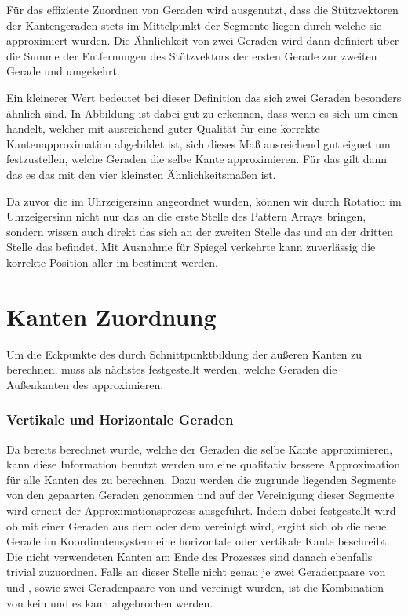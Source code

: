 Für das effiziente Zuordnen von Geraden wird ausgenutzt, dass die Stützvektoren der Kantengeraden stets im Mittelpunkt der Segmente liegen durch welche sie approximiert wurden. Die Ähnlichkeit von zwei Geraden wird dann definiert über die Summe der Entfernungen des Stützvektors der ersten Gerade zur zweiten Gerade und umgekehrt.


 Ein kleinerer Wert bedeutet bei dieser Definition das sich zwei Geraden besonders ähnlich sind. In Abbildung  ist dabei gut zu erkennen, dass wenn es sich um einen \QRCode handelt, welcher mit ausreichend guter Qualität für eine korrekte Kantenapproximation abgebildet ist, sich dieses Maß ausreichend gut eignet um festzustellen, welche Geraden die selbe Kante approximieren. Für das \olfp gilt dann das es das \fp mit den vier kleinsten Ähnlichkeitsmaßen ist.

Da zuvor die \fps im Uhrzeigersinn angeordnet wurden, können wir durch Rotation im Uhrzeigersinn nicht nur das \olfp an die erste Stelle des Pattern Arrays bringen, sondern wissen auch direkt das sich an der zweiten Stelle das \orfp und an der dritten Stelle das \ulfp befindet. Mit Ausnahme für Spiegel verkehrte \QRCodes kann zuverlässig die korrekte Position aller \fps im \QRCode bestimmt werden.

\section{Kanten Zuordnung}
Um die Eckpunkte des \QRCodes durch Schnittpunktbildung der äußeren Kanten zu berechnen, muss als nächstes festgestellt werden, welche Geraden die Außenkanten des \QRCodes approximieren.

\subsubsection{Vertikale und Horizontale Geraden}
Da bereits berechnet wurde, welche der Geraden die selbe Kante approximieren, kann diese Information benutzt werden um eine qualitativ bessere Approximation für alle Kanten des \olfp zu berechnen. Dazu werden die zugrunde liegenden Segmente von den gepaarten Geraden genommen und auf der Vereinigung dieser Segmente wird erneut der Approximationsprozess ausgeführt. Indem dabei festgestellt wird ob mit einer Geraden aus dem \orfp oder dem \ulfp vereinigt wird, ergibt sich ob die neue Gerade im \QRCode Koordinatensystem eine horizontale oder vertikale Kante beschreibt. Die nicht verwendeten Kanten am Ende des Prozesses sind danach ebenfalls trivial zuzuordnen. Falls an dieser Stelle nicht genau je zwei Geradenpaare von \olfp und \orfp, sowie zwei Geradenpaare von \olfp und \orfp vereinigt wurden, ist die Kombination von \fps kein \QRCode und es kann abgebrochen werden.

